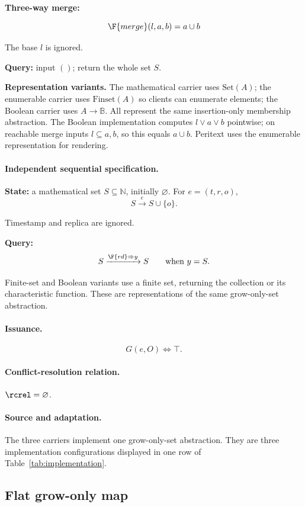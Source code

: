 \textbf{Three-way merge:}

\[
\F{merge}(l,a,b)=a\cup b
\]


The base $l$ is ignored.

\textbf{Query:} input $()$; return the whole set $S$.

\textbf{Representation variants.} The mathematical carrier uses $\mathrm{Set}(A)$; the enumerable carrier uses $\mathrm{Finset}(A)$ so clients can enumerate elements; the Boolean carrier uses $A\to\mathbb B$. All represent the same insertion-only membership abstraction. The Boolean implementation computes $l\lor a\lor b$ pointwise; on reachable merge inputs $l\subseteq a,b$, so this equals $a\cup b$. Peritext uses the enumerable representation for rendering.


\paragraph{Independent sequential specification.}
\textbf{State:} a mathematical set $S\subseteq\mathbb N$, initially $\varnothing$. For $e=(t,r,o)$,
\[
S\xrightarrow{e}S\cup\{o\}.
\]

Timestamp and replica are ignored.

\textbf{Query:}
\[
S\xrightarrow{\F{rd}\Rightarrow y}S\qquad\text{when }y=S.
\]

Finite-set and Boolean variants use a finite set, returning the collection or its characteristic function. These are representations of the same grow-only-set abstraction.


\paragraph{Issuance.}
\[
G(e,O)\iff\top.
\]

\paragraph{Conflict-resolution relation.}
$\rcrel=\varnothing$.


\paragraph{Source and adaptation.}
The three carriers implement one grow-only-set abstraction. They are three implementation configurations displayed in one row of Table~\ref{tab:implementation}.


\subsection{Flat grow-only map}
\label{app:dt-flat-grow-only-map}


